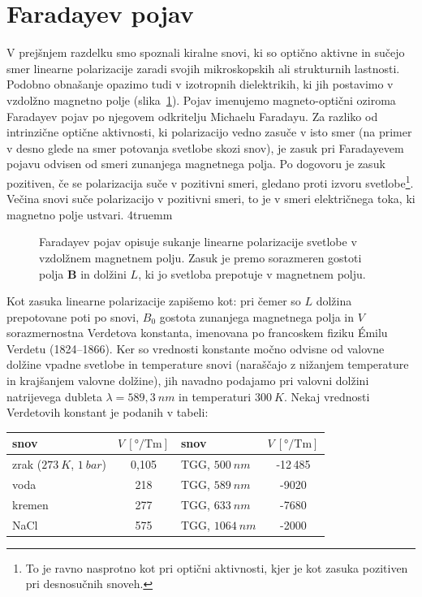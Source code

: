 \section{Faradayev pojav}
V prejšnjem razdelku smo spoznali kiralne snovi, ki so optično aktivne in sučejo smer
linearne polarizacije zaradi svojih mikroskopskih ali strukturnih lastnosti. 
Podobno obnašanje opazimo tudi v izotropnih dielektrikih, ki jih postavimo v vzdolžno
magnetno polje (slika~\ref{fig:09_Faraday}). Pojav imenujemo magneto-optični oziroma Faradayev pojav
po njegovem odkritelju Michaelu Faradayu. Za razliko 
od intrinzične optične aktivnosti, ki polarizacijo vedno zasuče v isto smer (na primer
v desno glede na smer potovanja svetlobe skozi snov), je zasuk pri Faradayevem pojavu 
odvisen od smeri zunanjega 
magnetnega polja. Po dogovoru je zasuk pozitiven, če se polarizacija suče v 
pozitivni smeri, gledano proti izvoru svetlobe\footnote{To je ravno nasprotno kot
pri optični aktivnosti, kjer je kot zasuka pozitiven pri desnosučnih snoveh.}.
Večina snovi suče polarizacijo v pozitivni smeri, to je v smeri električnega toka, ki
magnetno polje ustvari.
\vglue4truemm
\begin{figure}[ht]
\centering
\def\svgwidth{120truemm} 

\caption{Faradayev pojav opisuje sukanje linearne polarizacije svetlobe v vzdolžnem mag\-net\-nem
polju. Zasuk je premo sorazmeren gostoti polja $\mathbf{B}$ in dolžini $L$, ki jo svetloba prepotuje
v magnetnem polju.}
\label{fig:09_Faraday}
\end{figure}

Kot zasuka linearne polarizacije zapišemo kot:
pri čemer so $L$ dolžina prepotovane poti po snovi, $B_0$ gostota zunanjega 
magnetnega polja in $V$ sorazmernostna Verdetova konstanta, imenovana po 
francoskem
fiziku \'{E}milu Verdetu (1824--1866). Ker so vrednosti konstante močno 
odvisne od valovne dolžine vpadne svetlobe in temperature snovi 
(naraščajo z nižanjem temperature in krajšanjem valovne dolžine), jih navadno
podajamo pri valovni dolžini natrijevega dubleta $\lambda = 589,3~\si{nm}$ in 
temperaturi $300~\si{K}$. 
Nekaj vrednosti Verdetovih konstant je podanih v tabeli:

\begin{center}
\begin{tabular}{|l|c||l|c|}
\hline
snov& $V~[\si{\degree/\tesla\metre}]$ & snov& $V~[\si{\degree/\tesla\metre}]$\\ \hline 
zrak ($273~\si{K}$, $1~\si{bar}$) & 0,105 & TGG, $500~\si{nm}$ & -12\,485    \\ \hline
voda & 218 & TGG, $589~\si{nm}$ & -9020\\ \hline
kremen & 277 & TGG, $633~\si{nm}$ & -7680\\ \hline
NaCl & 575 & TGG, $1064~\si{nm}$ & -2000\\ \hline
\end{tabular}
\end{center}

